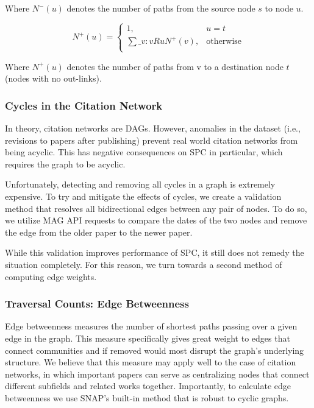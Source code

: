 \documentclass[lettepaper,]{article}
\begin{document}
Where \(N^{-}(u)\) denotes the number of paths from the source node
\(s\) to node \(u\).

\[ N^{+}(u) = \begin{cases}
1, & u = t \\
\sum\_{v:vRu} N^{+}(v), & \text{otherwise} \\
\end{cases} \]

Where \(N^{+}(u)\) denotes the number of paths from v to a destination
node \(t\) (nodes with no out-links).

\hypertarget{cycles-in-the-citation-network}{%
\subsubsection{Cycles in the Citation
Network}\label{cycles-in-the-citation-network}}

In theory, citation networks are DAGs. However, anomalies in the dataset
(i.e., revisions to papers after publishing) prevent real world citation
networks from being acyclic. This has negative consequences on SPC in
particular, which requires the graph to be acyclic.

Unfortunately, detecting and removing all cycles in a graph is extremely
expensive. To try and mitigate the effects of cycles, we create a
validation method that resolves all bidirectional edges between any pair
of nodes. To do so, we utilize MAG API requests to compare the dates of
the two nodes and remove the edge from the older paper to the newer
paper.

While this validation improves performance of SPC, it still does not
remedy the situation completely. For this reason, we turn towards a
second method of computing edge weights.

\hypertarget{traversal-counts-edge-betweenness}{%
\subsubsection{Traversal Counts: Edge
Betweenness}\label{traversal-counts-edge-betweenness}}

Edge betweenness measures the number of shortest paths passing over a
given edge in the graph. This measure specifically gives great weight to
edges that connect communities and if removed would most disrupt the
graph's underlying structure. We believe that this measure may apply
well to the case of citation networks, in which important papers can
serve as centralizing nodes that connect different subfields and related
works together. Importantly, to calculate edge betweenness we use SNAP's
built-in method that is robust to cyclic graphs.
\end{document}
